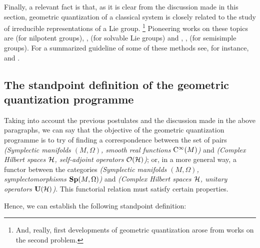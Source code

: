 \documentclass[12pt]{article}
\theoremstyle{plain}
\def\H{{\cal H}}
\def\Cinfty{{\rm C}^\infty}
\begin{document}
Finally, a relevant fact is that, as it is clear from the discussion
made in this section,
geometric quantization of a classical system is closely related to the
study of irreducible
representations of a Lie group.%
\footnote{
And, really, first developments of geometric quantization
arose from works on the second problem.}
Pioneering works on these topics are \cite{Ki-62} (for nilpotent
groups),
\cite{AK-71}, \cite{Be-rglr} (for solvable Lie groups)
and \cite{Bl-73}, \cite{Bl-77}, \cite{RW-rsg} (for semisimple groups).
For a summarized guideline of some of these methods see,
for instance, \cite{Ki-gq} and \cite{Wn-77}.



\subsection{The standpoint definition of the
            geometric quantization programme}



Taking into account the previous postulates and the discussion
made in the above paragraphs, we can say that
the objective of the geometric quantization programme
is to try of finding a correspondence between the set of pairs
{\it (Symplectic manifolds $(M,\Omega )$,  smooth real functions
$\Cinfty (M)$)}
and {\it (Complex Hilbert spaces $\H$, self-adjoint operators ${\cal
O}(\H )$)};
or, in a more general way, a functor between the categories
{\it (Symplectic manifolds $(M,\Omega )$, symplectomorphisms ${\bf
Sp}(M,\Omega )$)}
and {\it (Complex Hilbert spaces $\H$, unitary operators ${\bf U}(\H
)$)}.
This functorial relation must satisfy certain properties.

Hence, we can establish the following standpoint definition:
\end{document}
